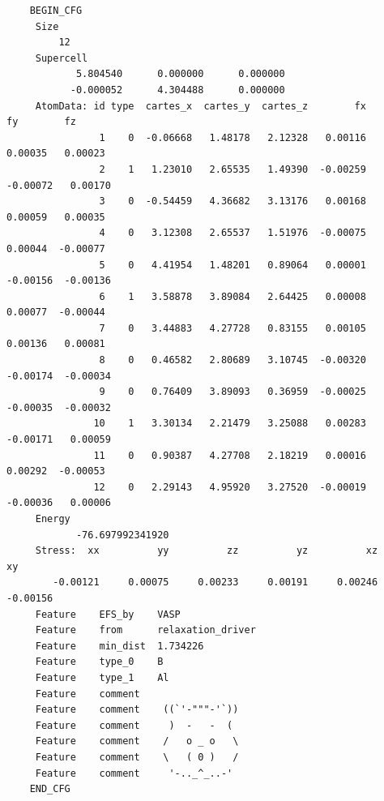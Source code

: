 \documentclass[12pt]{article}
\renewcommand{\_}{\char`_}
\begin{document}
{\small
	\begin{verbatim}
	BEGIN_CFG
	 Size
	     12
	 Supercell
	        5.804540      0.000000      0.000000
	       -0.000052      4.304488      0.000000
	 AtomData: id type  cartes_x  cartes_y  cartes_z        fx        fy        fz
	            1    0  -0.06668   1.48178   2.12328   0.00116   0.00035   0.00023
	            2    1   1.23010   2.65535   1.49390  -0.00259  -0.00072   0.00170
	            3    0  -0.54459   4.36682   3.13176   0.00168   0.00059   0.00035
	            4    0   3.12308   2.65537   1.51976  -0.00075   0.00044  -0.00077
	            5    0   4.41954   1.48201   0.89064   0.00001  -0.00156  -0.00136
	            6    1   3.58878   3.89084   2.64425   0.00008   0.00077  -0.00044
	            7    0   3.44883   4.27728   0.83155   0.00105   0.00136   0.00081
	            8    0   0.46582   2.80689   3.10745  -0.00320  -0.00174  -0.00034
	            9    0   0.76409   3.89093   0.36959  -0.00025  -0.00035  -0.00032
	           10    1   3.30134   2.21479   3.25088   0.00283  -0.00171   0.00059
	           11    0   0.90387   4.27708   2.18219   0.00016   0.00292  -0.00053
	           12    0   2.29143   4.95920   3.27520  -0.00019  -0.00036   0.00006
	 Energy
	        -76.697992341920
	 Stress:  xx          yy          zz          yz          xz          xy
	    -0.00121     0.00075     0.00233     0.00191     0.00246    -0.00156
	 Feature    EFS_by    VASP
	 Feature    from      relaxation_driver
	 Feature    min_dist  1.734226
	 Feature    type_0    B
	 Feature    type_1    Al
	 Feature    comment	  
	 Feature    comment	   ((`'-"""-'`))
	 Feature    comment	    )  -   -  (
	 Feature    comment	   /   o _ o   \
	 Feature    comment	   \   ( 0 )   /
	 Feature    comment	    '-.._^_..-' 
	END_CFG
	\end{verbatim}
}
\end{document}
